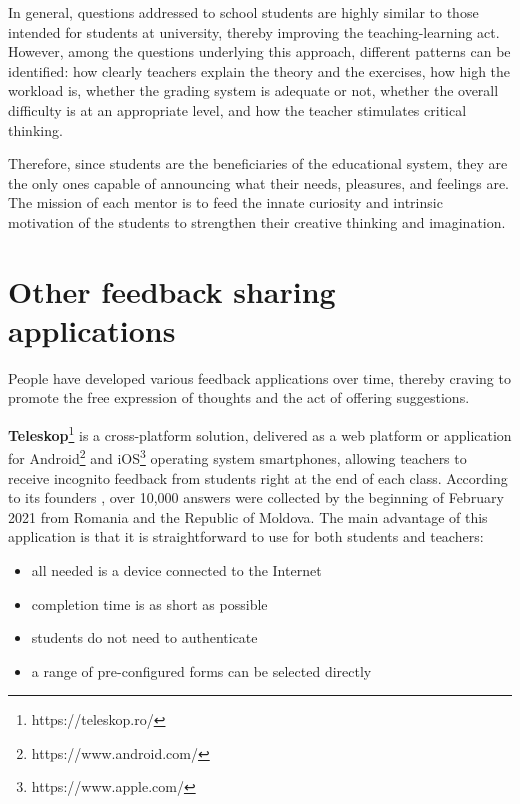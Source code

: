     In general, questions addressed to school students are highly similar to those intended for students at university, thereby improving the teaching-learning act. However, among the questions underlying this approach, different patterns can be identified: how clearly teachers explain the theory and the exercises, how high the workload is, whether the grading system is adequate or not, whether the overall difficulty is at an appropriate level, and how the teacher stimulates critical thinking.
    
	Therefore, since students are the beneficiaries of the educational system, they are the only ones capable of announcing what their needs, pleasures, and feelings are. The mission of each mentor is to feed the innate curiosity and intrinsic motivation of the students to strengthen their creative thinking and imagination.

\section{Other feedback sharing applications} \label{2:other_apps}

    People have developed various feedback applications over time, thereby craving to promote the free expression of thoughts and the act of offering suggestions.
    
	\textbf{Teleskop}\footnote{https://teleskop.ro/} is a cross-platform solution, delivered as a web platform or application for Android\footnote{https://www.android.com/} and iOS\footnote{https://www.apple.com/} operating system smartphones, allowing teachers to receive incognito feedback from students right at the end of each class. According to its founders \cite{teleskop10000}, over 10,000 answers were collected by the beginning of February 2021 from Romania and the Republic of Moldova. The main advantage of this application is that it is straightforward to use for both students and teachers:
	
	\begin{itemize}
            \setlength{\topsep}{0.5pt}
            \setlength{\itemsep}{0.5pt}
            \setlength{\parsep}{0.5pt}
            \item all needed is a device connected to the Internet
            \item completion time is as short as possible
            \item students do not need to authenticate
            \item a range of pre-configured forms can be selected directly
\end{itemize}
	
